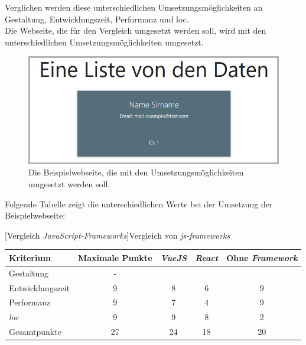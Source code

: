 Verglichen werden diese unterschiedlichen Umsetzungsmöglichkeiten an Gestaltung, Entwicklungszeit, Performanz und \Gls{loc}.\\
Die Webseite, die für den Vergleich umgesetzt werden soll, wird mit den unterschiedlichen Umsetzungsmöglichkeiten umgesetzt.\\
\begin{figure}[H]
	\centering
	\includegraphics[width=0.8\linewidth]{images/rfoster_study/example_page}
	\caption[Die Beispielwebseite]{Die Beispielwebseite, die mit den Umsetzungsmöglichkeiten umgesetzt werden soll.}
	\label{fig:example}
\end{figure}
Folgende Tabelle zeigt die unterschiedlichen Werte bei der Umsetzung der Beispielwebseite:
\begin{table}
	[Vergleich \textit{JavaScript-Frameworks}]{Vergleich von \textit{\Gls{js}-\Gls{framework}s}}\label{tab:vergleich}
	\centering
	\label{center}
	\begin{tabular}{l|c|c|c|c}
		Kriterium        & Maximale Punkte & \textit{VueJS} & \textit{React} & Ohne \textit{Framework}  \\\hline
		Gestaltung           & -                        &            \checkmark               &             \checkmark              &          \checkmark                           \\
		Entwicklungszeit & 9                         &             8              &               6            &               9                      \\
		Performanz       & 9                         &             7              &               4            &                 9                    \\
		\textit{\Gls{loc}}              & 9                         &             9              &               8            &                   2                  \\
		Gesamtpunkte     & 27                         &              24             &               18            &                20                    
	\end{tabular}
\end{table}
